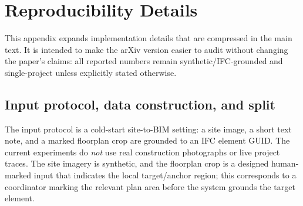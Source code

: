 \section{Reproducibility Details}
\label{app:repro}

This appendix expands implementation details that are compressed in the main text. It is intended to make the arXiv version easier to audit without changing the paper's claims: all reported numbers remain synthetic/IFC-grounded and single-project unless explicitly stated otherwise.

\subsection{Input protocol, data construction, and split}
\label{app:data}

The input protocol is a cold-start site-to-BIM setting: a site image, a short text note, and a marked floorplan crop are grounded to an IFC element GUID. The current experiments do \emph{not} use real construction photographs or live project traces. The site imagery is synthetic, and the floorplan crop is a designed human-marked input that indicates the local target/anchor region; this corresponds to a coordinator marking the relevant plan area before the system grounds the target element.

